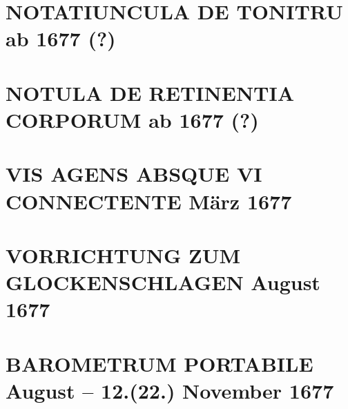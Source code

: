 \documentclass[%
fontsize=10pt,
]{scrbook}
\DeclareRobustCommand{\bracks}[1]{%
\textup{\lbrack}#1\textup{\rbrack}}
\begin{document}
 



\chapter[tocentry={Notatiuncula de tonitru %
\enskip \bracks{%
ab 1677 (?)%
}}, %
head={Notatiuncula de tonitru%
}]%
{\MakeUppercase{Notatiuncula de tonitru} %
\newline\bracks{%
ab 1677 (?)%
}}%
\label{60249}




\chapter[tocentry={Notula de retinentia corporum %
\enskip\bracks{%
ab 1677 (?)%
}}, %
head={De retinentia corporum%
}]%
{\MakeUppercase{Notula de retinentia corporum} %
\newline\bracks{%
ab 1677 (?)%
}}%
\label{41172}




\chapter[tocentry={Vis agens absque vi connectente
\enskip März 1677},
head={Vis agens absque vi connectente}]%
{\MakeUppercase{Vis agens absque vi connectente}
\newline März 1677}
\label{60277}




\chapter[tocentry={Vorrichtung zum Glockenschlagen
\enskip \lbrack August 1677\rbrack},
head={Vorrichtung zum Glockenschlagen}]%
{\MakeUppercase{Vorrichtung zum Glockenschlagen}
\newline \lbrack August 1677\rbrack}
\label{57037-3}




\chapter[tocentry={Barometrum portabile %
\enskip August -- 12.\;(22.) November 1677},
head={Barometrum portabile}]%
{\MakeUppercase{Barometrum portabile}
\newline August -- 12.\;(22.) November 1677}
\label{barom-portab_intro}

\end{document}
